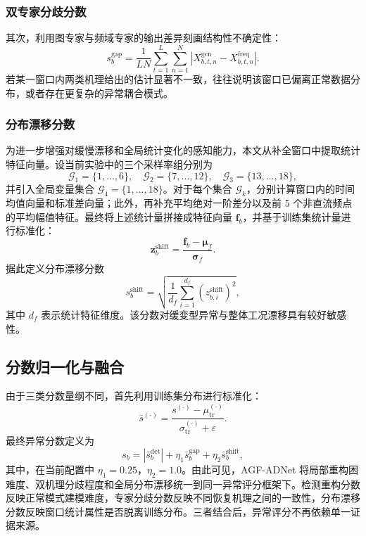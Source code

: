 \subsubsection{双专家分歧分数}

其次，利用图专家与频域专家的输出差异刻画结构性不确定性：
\begin{equation}
    s_b^{\mathrm{gap}}
    =
    \frac{1}{LN}
    \sum_{t=1}^{L}\sum_{n=1}^{N}
    \left|
        X_{b,t,n}^{\mathrm{gcn}} - X_{b,t,n}^{\mathrm{freq}}
    \right|.
\end{equation}
若某一窗口内两类机理给出的估计显著不一致，往往说明该窗口已偏离正常数据分布，或者存在更复杂的异常耦合模式。

\subsubsection{分布漂移分数}

为进一步增强对缓慢漂移和全局统计变化的感知能力，本文从补全窗口中提取统计特征向量。设当前实验中的三个采样率组分别为
\begin{equation}
    \mathcal{G}_1=\{1,\ldots,6\},\quad
    \mathcal{G}_2=\{7,\ldots,12\},\quad
    \mathcal{G}_3=\{13,\ldots,18\},
\end{equation}
并引入全局变量集合 $\mathcal{G}_4=\{1,\ldots,18\}$。对于每个集合 $\mathcal{G}_k$，分别计算窗口内的时间均值向量和标准差向量；此外，再补充平均绝对一阶差分以及前 5 个非直流频点的平均幅值特征。最终将上述统计量拼接成特征向量 $\mathbf{f}_b$，并基于训练集统计量进行标准化：
\begin{equation}
    \mathbf{z}_b^{\mathrm{shift}} = \frac{\mathbf{f}_b-\boldsymbol{\mu}_f}{\boldsymbol{\sigma}_f}.
\end{equation}
据此定义分布漂移分数
\begin{equation}
    s_b^{\mathrm{shift}}
    =
    \sqrt{
        \frac{1}{d_f}
        \sum_{i=1}^{d_f}
        \left(z_{b,i}^{\mathrm{shift}}\right)^2
    },
\end{equation}
其中 $d_f$ 表示统计特征维度。该分数对缓变型异常与整体工况漂移具有较好敏感性。

\subsection{分数归一化与融合}

由于三类分数量纲不同，首先利用训练集分布进行标准化：
\begin{equation}
    \bar{s}^{(\cdot)} = \frac{s^{(\cdot)}-\mu^{(\cdot)}_{\mathrm{tr}}}{\sigma^{(\cdot)}_{\mathrm{tr}} + \varepsilon}.
\end{equation}
最终异常分数定义为
\begin{equation}
    s_b
    =
    \left|\bar{s}_b^{\mathrm{det}}\right|
    +
    \eta_1 \bar{s}_b^{\mathrm{gap}}
    +
    \eta_2 \bar{s}_b^{\mathrm{shift}},
\end{equation}
其中，在当前配置中 $\eta_1=0.25$，$\eta_2=1.0$。由此可见，AGF-ADNet 将局部重构困难度、双机理分歧程度和全局分布漂移统一到同一异常评分框架下。检测重构分数反映正常模式建模难度，专家分歧分数反映不同恢复机理之间的一致性，分布漂移分数反映窗口统计属性是否脱离训练分布。三者结合后，异常评分不再依赖单一证据来源。

